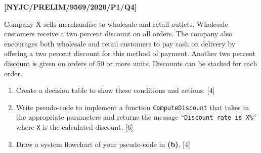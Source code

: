 \item \textbf{{[}NYJC/PRELIM/9569/2020/P1/Q4{]} }

Company X sells merchandise to wholesale and retail outlets. Wholesale
customers receive a two percent discount on all orders. The company
also encourages both wholesale and retail customers to pay cash on
delivery by offering a two percent discount for this method of payment.
Another two percent discount is given on orders of 50 or more units.
Discounts can be stacked for each order.
\begin{enumerate}
\item Create a decision table to show these conditions and actions. \hfill{}
{[}4{]}
\item Write pseudo-code to implement a function \texttt{ComputeDiscount}
that takes in the appropriate parameters and returns the message \textquotedblleft \texttt{Discount
rate is X\%}\textquotedblright{} where \texttt{X} is the calculated
discount. \hfill{}{[}6{]}
\item Draw a system flowchart of your pseudo-code in \textbf{(b)}. \hfill{}{[}4{]}
\end{enumerate}